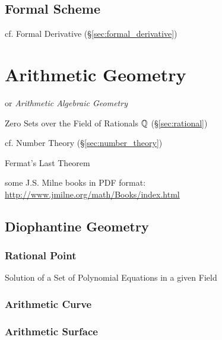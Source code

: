 \subsection{Formal Scheme}\label{sec:formal_scheme}

cf. Formal Derivative (\S\ref{sec:formal_derivative})



\section{Arithmetic Geometry}\label{sec:arithmetic_geometry}

or \emph{Arithmetic Algebraic Geometry}

Zero Sets over the Field of Rationals $\mathbb{Q}$ (\S\ref{sec:rational})

cf. Number Theory (\S\ref{sec:number_theory})

Fermat's Last Theorem

some J.S. Milne books in PDF format:
\url{http://www.jmilne.org/math/Books/index.html}



\subsection{Diophantine Geometry}\label{sec:diophantine_geometry}

\subsubsection{Rational Point}\label{sec:rational_point}

Solution of a Set of Polynomial Equations in a given Field



\subsubsection{Arithmetic Curve}\label{sec:arithmetic_curve}


\subsubsection{Arithmetic Surface}\label{sec:arithmetic_surface}

